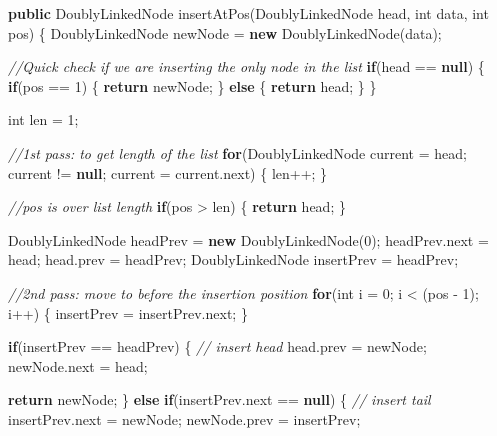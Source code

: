 \documentclass[]{book}
\newenvironment{Shaded}{\begin{snugshade}}{\end{snugshade}}
\newcommand{\CommentTok}[1]{\textcolor[rgb]{0.56,0.35,0.01}{\textit{#1}}}
\newcommand{\DataTypeTok}[1]{\textcolor[rgb]{0.13,0.29,0.53}{#1}}
\newcommand{\DecValTok}[1]{\textcolor[rgb]{0.00,0.00,0.81}{#1}}
\newcommand{\FunctionTok}[1]{\textcolor[rgb]{0.00,0.00,0.00}{#1}}
\newcommand{\KeywordTok}[1]{\textcolor[rgb]{0.13,0.29,0.53}{\textbf{#1}}}
\newcommand{\NormalTok}[1]{#1}
\begin{document}
\begin{Shaded}
\begin{Highlighting}[]
\KeywordTok{public}\NormalTok{ DoublyLinkedNode }\FunctionTok{insertAtPos}\NormalTok{(DoublyLinkedNode head, }\DataTypeTok{int}\NormalTok{ data, }\DataTypeTok{int}\NormalTok{ pos) \{}
\NormalTok{    DoublyLinkedNode newNode = }\KeywordTok{new} \FunctionTok{DoublyLinkedNode}\NormalTok{(data);}

    \CommentTok{//Quick check if we are inserting the only node in the list}
    \KeywordTok{if}\NormalTok{(head == }\KeywordTok{null}\NormalTok{) \{}
        \KeywordTok{if}\NormalTok{(pos == }\DecValTok{1}\NormalTok{) \{}
            \KeywordTok{return}\NormalTok{ newNode;}
\NormalTok{        \} }\KeywordTok{else}\NormalTok{ \{}
            \KeywordTok{return}\NormalTok{ head;}
\NormalTok{        \}}
\NormalTok{    \}}


    \DataTypeTok{int}\NormalTok{ len = }\DecValTok{1}\NormalTok{;}

    \CommentTok{//1st pass: to get length of the list}
    \KeywordTok{for}\NormalTok{(DoublyLinkedNode current = head; current != }\KeywordTok{null}\NormalTok{; current = current.}\FunctionTok{next}\NormalTok{) \{}
\NormalTok{        len++;}
\NormalTok{    \}}

    \CommentTok{//pos is over list length}
    \KeywordTok{if}\NormalTok{(pos > len) \{}
        \KeywordTok{return}\NormalTok{ head;}
\NormalTok{    \}}

\NormalTok{    DoublyLinkedNode headPrev = }\KeywordTok{new} \FunctionTok{DoublyLinkedNode}\NormalTok{(}\DecValTok{0}\NormalTok{);}
\NormalTok{    headPrev.}\FunctionTok{next}\NormalTok{ = head;}
\NormalTok{    head.}\FunctionTok{prev}\NormalTok{ = headPrev;}
\NormalTok{    DoublyLinkedNode insertPrev = headPrev;}


    \CommentTok{//2nd pass: move to before the insertion position}
    \KeywordTok{for}\NormalTok{(}\DataTypeTok{int}\NormalTok{ i = }\DecValTok{0}\NormalTok{; i < (pos - }\DecValTok{1}\NormalTok{); i++) \{}
\NormalTok{        insertPrev = insertPrev.}\FunctionTok{next}\NormalTok{;}
\NormalTok{    \}}

    \KeywordTok{if}\NormalTok{(insertPrev == headPrev) \{}
        \CommentTok{// insert head}
\NormalTok{        head.}\FunctionTok{prev}\NormalTok{ = newNode;}
\NormalTok{        newNode.}\FunctionTok{next}\NormalTok{ = head;}

        \KeywordTok{return}\NormalTok{ newNode;}
\NormalTok{    \} }\KeywordTok{else} \KeywordTok{if}\NormalTok{(insertPrev.}\FunctionTok{next}\NormalTok{ == }\KeywordTok{null}\NormalTok{) \{}
        \CommentTok{// insert tail}
\NormalTok{        insertPrev.}\FunctionTok{next}\NormalTok{ = newNode;}
\NormalTok{        newNode.}\FunctionTok{prev}\NormalTok{ = insertPrev;}


\end{Highlighting}
\end{Shaded}
\end{document}
